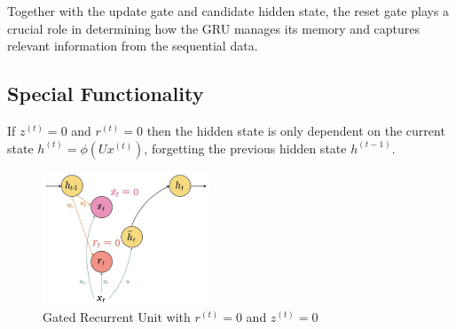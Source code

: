 \begin{figure}[h]
\centering     %
{}
\label{fig:reset-gate-rt}
\end{figure}

\noindent Together with the update gate and candidate hidden state, the reset gate plays a crucial role in determining how the GRU manages its memory and captures relevant information from the sequential data.

\subsection{Special Functionality}

\noindent If $z^{(t)} = 0$ and $r^{(t)} = 0$ then the hidden state is only dependent on the current state \linebreak $h^{(t)} = \phi \left( U x^{(t)} \right)$, forgetting the previous hidden state $h^{(t-1)}$.

\begin{figure}[h]
    \centering
    \includegraphics[width=5cm]{Images/GRUr0z0.png}
    \caption{Gated Recurrent Unit with $r^{(t)} = 0$ and $z^{(t)} = 0$}
    \label{fig:gru-r0-z0}
\end{figure}

